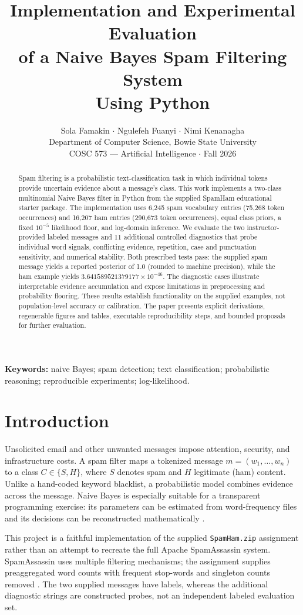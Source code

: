 \documentclass[11pt,letterpaper]{article}
\title{\vspace{-1.3em}\LARGE\bfseries Implementation and Experimental Evaluation\\of a Naive Bayes Spam Filtering System\\Using Python\vspace{.3em}}
\author{Sola Famakin \quad $\cdot$ \quad Ngulefeh Fuanyi \quad $\cdot$ \quad Nimi Kenanagha\\Department of Computer Science, Bowie State University\\[.4em]{\small COSC 573 --- Artificial Intelligence \quad $\cdot$ \quad Fall 2026}}
\date{}
\begin{document}
\maketitle\thispagestyle{fancy}
\begin{abstract}
Spam filtering is a probabilistic text-classification task in which individual tokens provide uncertain evidence about a message's class. This work implements a two-class multinomial Naive Bayes filter in Python from the supplied SpamHam educational starter package. The implementation uses 6,245 spam vocabulary entries (75,268 token occurrences) and 16,207 ham entries (290,673 token occurrences), equal class priors, a fixed $10^{-5}$ likelihood floor, and log-domain inference. We evaluate the two instructor-provided labeled messages and 11 additional controlled diagnostics that probe individual word signals, conflicting evidence, repetition, case and punctuation sensitivity, and numerical stability. Both prescribed tests pass: the supplied spam message yields a reported posterior of 1.0 (rounded to machine precision), while the ham example yields $3.641589521379177\times10^{-46}$. The diagnostic cases illustrate interpretable evidence accumulation and expose limitations in preprocessing and probability flooring. These results establish functionality on the supplied examples, not population-level accuracy or calibration. The paper presents explicit derivations, regenerable figures and tables, executable reproducibility steps, and bounded proposals for further evaluation.
\end{abstract}
\noindent\textbf{Keywords:} naive Bayes; spam detection; text classification; probabilistic reasoning; reproducible experiments; log-likelihood.

\section{Introduction}
Unsolicited email and other unwanted messages impose attention, security, and infrastructure costs. A spam filter maps a tokenized message $m=(w_1,\ldots,w_n)$ to a class $C\in\{S,H\}$, where $S$ denotes spam and $H$ legitimate (ham) content. Unlike a hand-coded keyword blacklist, a probabilistic model combines evidence across the message. Naive Bayes is especially suitable for a transparent programming exercise: its parameters can be estimated from word-frequency files and its decisions can be reconstructed mathematically \citep{russell2022,raschka2014}.

This project is a faithful implementation of the supplied \texttt{SpamHam.zip} assignment rather than an attempt to recreate the full Apache SpamAssassin system. SpamAssassin uses multiple filtering mechanisms; the assignment supplies preaggregated word counts with frequent stop-words and singleton counts removed \citep{assignment,spamassassin}. The two supplied messages have labels, whereas the additional diagnostic strings are constructed probes, not an independent labeled evaluation set.
\end{document}
